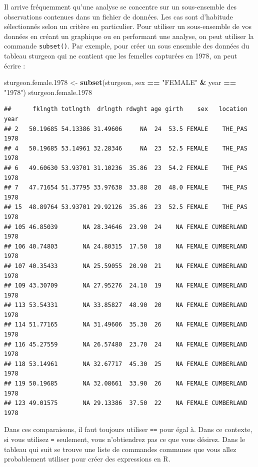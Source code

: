 \documentclass[12pt,]{book}
\makeatletter
\newenvironment{Shaded}{\begin{snugshade}}{\end{snugshade}}
\newcommand{\FloatTok}[1]{\textcolor[rgb]{0.00,0.00,0.81}{#1}}
\newcommand{\KeywordTok}[1]{\textcolor[rgb]{0.13,0.29,0.53}{\textbf{#1}}}
\newcommand{\NormalTok}[1]{#1}
\newcommand{\OperatorTok}[1]{\textcolor[rgb]{0.81,0.36,0.00}{\textbf{#1}}}
\newcommand{\StringTok}[1]{\textcolor[rgb]{0.31,0.60,0.02}{#1}}
\newenvironment{kframe}{%
\medskip{}
\setlength{\fboxsep}{.8em}
\def\at@end@of@kframe{}%
\ifinner\ifhmode%
 \def\at@end@of@kframe{\end{minipage}}%
 \begin{minipage}{\columnwidth}%
\fi\fi%
\def\FrameCommand##1{\hskip\@totalleftmargin \hskip-\fboxsep
\colorbox{incolor}{##1}\hskip-\fboxsep
    \hskip-\linewidth \hskip-\@totalleftmargin \hskip\columnwidth}%
\MakeFramed {\advance\hsize-\width
  \@totalleftmargin\z@ \linewidth\hsize
  \@setminipage}}%
{\par\unskip\endMakeFramed%
\at@end@of@kframe}
\newenvironment{rmdblock}[1]
 {
 \begin{itemize}
 \renewcommand{\labelitemi}{
   \raisebox{-.7\height}[0pt][0pt]{
     {\setkeys{Gin}{width=3em,keepaspectratio}\texttt{[image: images/\#1]}}
   }
 }
 \begin{kframe}
 \setlength{\fboxsep}{1em}
 \item
 }
 {
 \end{kframe}
 \end{itemize}
 }
\newenvironment{rmdcaution}
  {\begin{rmdblock}{caution}}
  {\end{rmdblock}}
\makeatother
\begin{document}
Il arrive fréquemment qu'une analyse se concentre sur un sous-ensemble des observations contenues dans un fichier de données.
Les cas sont d'habitude sélectionnés selon un critère en particulier.
Pour utiliser un sous-ensemble de vos données en créant un graphique ou en performant une analyse, on peut utiliser la commande \texttt{subset()}.
Par exemple, pour créer un sous ensemble des données du tableau sturgeon qui ne contient que les femelles capturées en 1978, on peut écrire :

\begin{Shaded}
\begin{Highlighting}[]
\NormalTok{sturgeon.female}\FloatTok{.1978}\NormalTok{ <-}\StringTok{ }\KeywordTok{subset}\NormalTok{(sturgeon, sex }\OperatorTok{==}\StringTok{ "FEMALE"} \OperatorTok{&}\StringTok{ }\NormalTok{year }\OperatorTok{==}\StringTok{ "1978"}\NormalTok{)}
\NormalTok{sturgeon.female}\FloatTok{.1978}
\end{Highlighting}
\end{Shaded}

\begin{verbatim}
##      fklngth totlngth  drlngth rdwght age girth    sex   location year
## 2   50.19685 54.13386 31.49606     NA  24  53.5 FEMALE    THE_PAS 1978
## 4   50.19685 53.14961 32.28346     NA  23  52.5 FEMALE    THE_PAS 1978
## 6   49.60630 53.93701 31.10236  35.86  23  54.2 FEMALE    THE_PAS 1978
## 7   47.71654 51.37795 33.97638  33.88  20  48.0 FEMALE    THE_PAS 1978
## 15  48.89764 53.93701 29.92126  35.86  23  52.5 FEMALE    THE_PAS 1978
## 105 46.85039       NA 28.34646  23.90  24    NA FEMALE CUMBERLAND 1978
## 106 40.74803       NA 24.80315  17.50  18    NA FEMALE CUMBERLAND 1978
## 107 40.35433       NA 25.59055  20.90  21    NA FEMALE CUMBERLAND 1978
## 109 43.30709       NA 27.95276  24.10  19    NA FEMALE CUMBERLAND 1978
## 113 53.54331       NA 33.85827  48.90  20    NA FEMALE CUMBERLAND 1978
## 114 51.77165       NA 31.49606  35.30  26    NA FEMALE CUMBERLAND 1978
## 116 45.27559       NA 26.57480  23.70  24    NA FEMALE CUMBERLAND 1978
## 118 53.14961       NA 32.67717  45.30  25    NA FEMALE CUMBERLAND 1978
## 119 50.19685       NA 32.08661  33.90  26    NA FEMALE CUMBERLAND 1978
## 123 49.01575       NA 29.13386  37.50  22    NA FEMALE CUMBERLAND 1978
\end{verbatim}

\begin{rmdcaution}
Dans ces comparaisons, il faut toujours utiliser \texttt{==} pour égal à.
Dans ce contexte, si vous utilisez \texttt{=} seulement, vous n'obtiendrez pas ce que vous désirez.
Dans le tableau qui suit se trouve une liste de commandes communes que vous allez probablement utiliser pour créer des expressions en R.
\end{rmdcaution}
\end{document}
